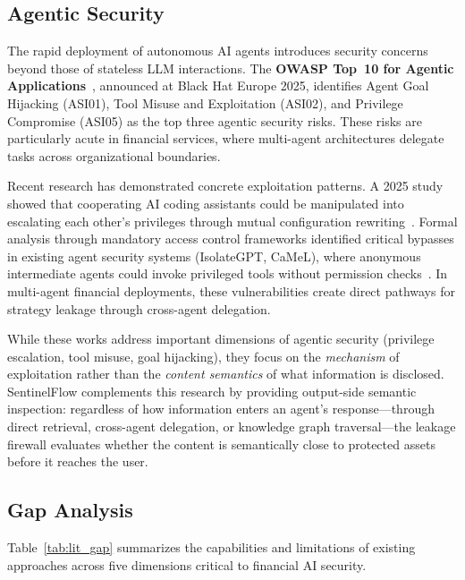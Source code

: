 \documentclass[journal,12pt,onecolumn,draftclsnofoot]{IEEEtran}
\begin{document}
\subsection{Agentic Security}
\label{Sect:LR_Agentic}

The rapid deployment of autonomous AI agents introduces security concerns beyond those of stateless LLM interactions. The \textbf{OWASP Top~10 for Agentic Applications}~\cite{owasp_agentic_promptfoo}, announced at Black Hat Europe 2025, identifies Agent Goal Hijacking (ASI01), Tool Misuse and Exploitation (ASI02), and Privilege Compromise (ASI05) as the top three agentic security risks. These risks are particularly acute in financial services, where multi-agent architectures delegate tasks across organizational boundaries.

Recent research has demonstrated concrete exploitation patterns. A 2025 study showed that cooperating AI coding assistants could be manipulated into escalating each other's privileges through mutual configuration rewriting~\cite{sombra_llm_security_2026}. Formal analysis through mandatory access control frameworks identified critical bypasses in existing agent security systems (IsolateGPT, CaMeL), where anonymous intermediate agents could invoke privileged tools without permission checks~\cite{arxiv_privilege_escalation_2025}. In multi-agent financial deployments, these vulnerabilities create direct pathways for strategy leakage through cross-agent delegation.

While these works address important dimensions of agentic security (privilege escalation, tool misuse, goal hijacking), they focus on the \textit{mechanism} of exploitation rather than the \textit{content semantics} of what information is disclosed. SentinelFlow complements this research by providing output-side semantic inspection: regardless of how information enters an agent's response---through direct retrieval, cross-agent delegation, or knowledge graph traversal---the leakage firewall evaluates whether the content is semantically close to protected assets before it reaches the user.

\subsection{Gap Analysis}
\label{Sect:LR_Gap}

Table~\ref{tab:lit_gap} summarizes the capabilities and limitations of existing approaches across five dimensions critical to financial AI security.
\end{document}
